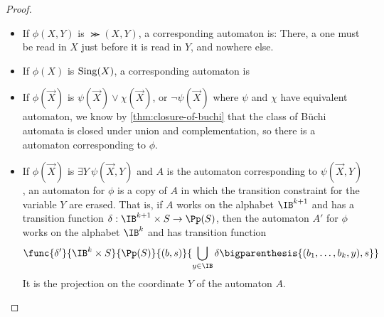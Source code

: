 \begin{proof}
\begin{itemize}
        \item If $\phi(X, Y)$ is $\Succ(X, Y)$,
            a corresponding automaton is:
            There, a one must be read in $X$ just before it is read in $Y$,
            and nowhere else.

        \item If $\phi(X)$ is $\mathrm{Sing}(X)$,
            a corresponding automaton is

        \item If $\phi(\vec X)$ is $\psi(\vec X) \vee \chi(\vec X)$,
            or $\neg \psi(\vec X)$
            where $\psi$ and $\chi$ have equivalent automaton,
            we know by \autoref{thm:closure-of-buchi}
            that the class of Büchi automata
            is closed under union and complementation,
            so there is a automaton corresponding to $\phi$.

        \item If $\phi(\vec X)$ is $\exists Y~ \psi(\vec X, Y)$
            and $A$ is the automaton corresponding to $\psi(\vec X, Y)$,
            an automaton for $\phi$ is a copy of $A$
            in which the transition constraint for the variable $Y$
            are erased. That is, if $A$ works on the alphabet $\IB^{k+1}$
            and has a transition function $\delta: \IB^{k+1} \times S \to \Pp(S)$,
            then the automaton $A'$ for $\phi$ works on the alphabet $\IB^{k}$
            and has transition function \[
                \func{\delta'}{\IB^k \times S}{\Pp(S)}
                    {(b, s)}{
                        \bigcup_{y \in \IB} \delta\bigparenthesis{(b_1, \dots, b_k, y), s}
                    }
            \]
            It is the projection on the coordinate $Y$ of the automaton $A$.
    \end{itemize}

\end{proof}

